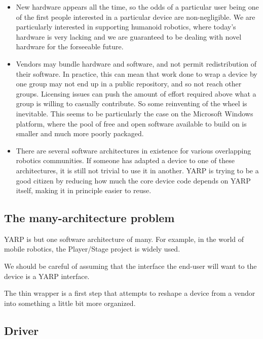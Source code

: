 \begin{itemize}

\item New hardware appears all the time, so the odds of a particular
user being one of the first people interested in a particular device are
non-negligible.  We are particularly interested in supporting humanoid
robotics, where today's hardware is very lacking and we are guaranteed
to be dealing with novel hardware for the forseeable future.

\item Vendors may bundle hardware and software, and not permit
redistribution of their software.  In practice, this can mean that
work done to wrap a device by one group may not end up in a public
repository, and so not reach other groups.  Licensing issues can push
the amount of effort required above what a group is willing to
casually contribute.  So some reinventing of the wheel is inevitable.
This seems to be particularly the case on the Microsoft Windows
platform, where the pool of free and open software available to build
on is smaller and much more poorly packaged.

\item There are several software architectures in existence for
various overlapping robotics communities.  If someone has adapted
a device to one of these architectures, it is still not trivial
to use it in another.  YARP is trying to be a good citizen by
reducing how much the core device code depends on YARP itself,
making it in principle easier to reuse.


\end{itemize}



\subsection{The many-architecture problem}

YARP is but one software architecture of many.  For example, in the
world of mobile robotics, the Player/Stage project is widely used.

We should 
be careful of assuming that the interface the end-user will want
to the device is a YARP interface.  

The thin wrapper is a first step that attempts to reshape a
device from a vendor into something a little bit more organized.



\subsection{Driver}

